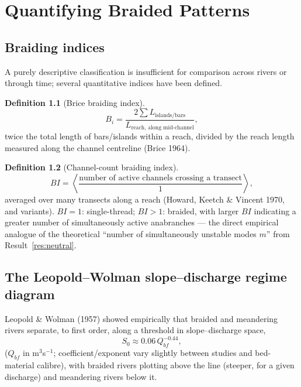 \documentclass[11pt,a4paper]{report}
\theoremstyle{definition}
\newtheorem{definition}{Definition}[chapter]
\theoremstyle{plain}
\theoremstyle{remark}
\begin{document}
\chapter{Quantifying Braided Patterns}
\label{ch:indices}

\section{Braiding indices}
A purely descriptive classification is insufficient for comparison across rivers or through time; several quantitative indices have been defined.

\begin{definition}[Brice braiding index]
\begin{equation}
B_i = \frac{2\sum L_{\text{islands/bars}}}{L_{\text{reach, along mid-channel}}},
\end{equation}
twice the total length of bars/islands within a reach, divided by the reach length measured along the channel centreline (Brice 1964).
\end{definition}

\begin{definition}[Channel-count braiding index]
\begin{equation}
BI = \left\langle \frac{\text{number of active channels crossing a transect}}{1}\right\rangle,
\end{equation}
averaged over many transects along a reach (Howard, Keetch \& Vincent 1970, and variants). $BI=1$: single-thread; $BI>1$: braided, with larger $BI$ indicating a greater number of simultaneously active anabranches — the direct empirical analogue of the theoretical ``number of simultaneously unstable modes $m$'' from Result~\ref{res:neutral}.
\end{definition}

\section{The Leopold--Wolman slope--discharge regime diagram}
Leopold \& Wolman (1957) showed empirically that braided and meandering rivers separate, to first order, along a threshold in slope--discharge space,
\begin{equation}
S_0 \approx 0.06\, Q_{bf}^{-0.44},
\label{eq:LW}
\end{equation}
($Q_{bf}$ in m$^3$s$^{-1}$; coefficient/exponent vary slightly between studies and bed-material calibre), with braided rivers plotting above the line (steeper, for a given discharge) and meandering rivers below it.
\end{document}
